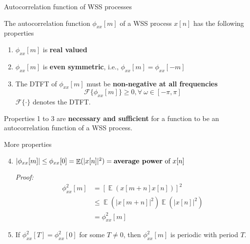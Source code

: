 \documentclass[10pt, handout]{beamer}
\DeclareMathOperator{\E}{\mathbb{E}} %
\begin{document}
%
\begin{frame}{Autocorrelation function of WSS processes}

The autocorrelation function $\phi_{xx}[m]$ of a WSS process $x[n]$ has the following properties

\begin{enumerate}
	\item $\phi_{xx}[m]$ is \textbf{real valued}
	\item $\phi_{xx}[m]$ is \textbf{even symmetric}, i.e., $\phi_{xx}[m] = \phi_{xx}[-m]$
	\item The DTFT of $\phi_{xx}[m]$ must be \textbf{non-negative at all frequencies}
	\begin{equation}
	\mathcal{F}\{\phi_{xx}[m]\} \geq 0, \forall~\omega\in[-\pi, \pi]
	\end{equation}
	$\mathcal{F}\{\cdot\}$ denotes the DTFT.	
\end{enumerate}

	Properties 1 to 3 are \textbf{necessary and sufficient} for a function to be an autocorrelation function of a WSS process.
\end{frame}

%
\begin{frame}
More properties
\begin{enumerate}\setcounter{enumi}{3}
	\item $|\phi_{xx}[m]| \leq \phi_{xx}[0] = \E(|x[n]|^2) = \text{\textbf{average power} of}~x[n]$
	
\textit{Proof:}
\begin{align*}
\phi_{xx}^2[m] &= [\E(x[m+n]x[n])]^2 \\
&\leq \E(|x[m+n]|^2)\E(|x[n]|^2) \tag{by Schwarz inequality} \\
&=\phi_{xx}^2[m] \tag{by stationarity}
\end{align*}
	\item If $\phi_{xx}^2[T] = \phi_{xx}^2[0]$ for some $T\neq 0$, then $\phi_{xx}^2[m]$ is periodic with period $T$.
\end{enumerate}
\end{frame}
\end{document}
